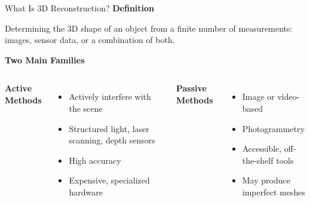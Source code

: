 \documentclass[aspectratio=169, 12pt]{beamer}
\begin{document}
\begin{frame}{What Is 3D Reconstruction?}
	\textbf{\textcolor{gbAqua}{Definition}}
	
	Determining the 3D shape of an object from a finite number of measurements: images, sensor data, or a combination of both.
	
	\vspace{0.3cm}
	
	\textbf{\textcolor{gbAqua}{Two Main Families}}
	
	\vspace{0.3cm}
	
	\begin{columns}[t]
		\textbf{Active Methods}
		\begin{itemize}
			\item Actively interfere with the scene
			\item Structured light, laser scanning, depth sensors
			\item High accuracy
			\item Expensive, specialized hardware
		\end{itemize}
		
		\textbf{Passive Methods}
		\begin{itemize}
			\item Image or video-based
			\item Photogrammetry
			\item Accessible, off-the-shelf tools
			\item May produce imperfect meshes
		\end{itemize}
	\end{columns}
	
	
\end{frame}
\end{document}
